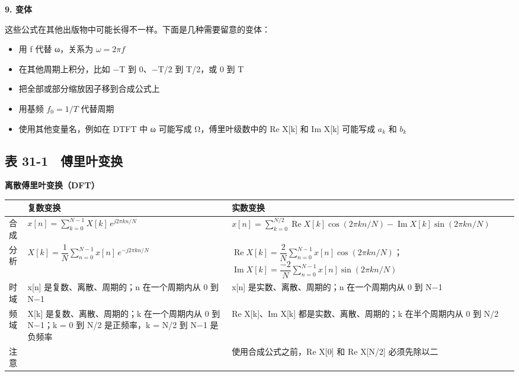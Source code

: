 \textbf{9. 变体}

这些公式在其他出版物中可能长得不一样。下面是几种需要留意的变体：

\begin{itemize}
\tightlist
\item
  用 f 代替 ω，关系为 \(\omega = 2\pi f\)
\item
  在其他周期上积分，比如 −T 到 0、−T/2 到 T/2，或 0 到 T
\item
  把全部或部分缩放因子移到合成公式上
\item
  用基频 \(f_0 = 1/T\) 代替周期
\item
  使用其他变量名，例如在 DTFT 中 ω 可能写成 Ω，傅里叶级数中的 Re
  X{[}k{]} 和 Im X{[}k{]} 可能写成 \(a_k\) 和 \(b_k\)
\end{itemize}

\subsection{表 31-1　傅里叶变换}

\textbf{离散傅里叶变换（DFT）}

{\def\LTcaptype{none} %
\begin{longtable}[]{@{}
  >{\raggedright\arraybackslash}p{}
  >{\raggedright\arraybackslash}p{}
  >{\raggedright\arraybackslash}p{}@{}}
\toprule\noalign{}
\begin{minipage}[b]{\linewidth}\raggedright
\end{minipage} & \begin{minipage}[b]{\linewidth}\raggedright
复数变换
\end{minipage} & \begin{minipage}[b]{\linewidth}\raggedright
实数变换
\end{minipage} \\
\midrule\noalign{}
\endhead
\bottomrule\noalign{}
\endlastfoot
合成 & \(x[n] = \displaystyle\sum_{k=0}^{N-1} X[k]\,e^{j2\pi kn/N}\) &
\(x[n] = \displaystyle\sum_{k=0}^{N/2} \operatorname{Re}X[k]\cos(2\pi kn/N) - \operatorname{Im}X[k]\sin(2\pi kn/N)\) \\
分析 &
\(X[k] = \dfrac{1}{N}\displaystyle\sum_{n=0}^{N-1} x[n]\,e^{-j2\pi kn/N}\)
&
\(\operatorname{Re}X[k] = \dfrac{2}{N}\displaystyle\sum_{n=0}^{N-1} x[n]\cos(2\pi kn/N)\)；\(\operatorname{Im}X[k] = \dfrac{-2}{N}\displaystyle\sum_{n=0}^{N-1} x[n]\sin(2\pi kn/N)\) \\
时域 & x{[}n{]} 是复数、离散、周期的；n 在一个周期内从 0 到 N−1 &
x{[}n{]} 是实数、离散、周期的；n 在一个周期内从 0 到 N−1 \\
频域 & X{[}k{]} 是复数、离散、周期的；k 在一个周期内从 0 到 N−1；k = 0
到 N/2 是正频率，k = N/2 到 N−1 是负频率 & Re X{[}k{]}、Im X{[}k{]}
都是实数、离散、周期的；k 在半个周期内从 0 到 N/2 \\
注意 & & 使用合成公式之前，Re X{[}0{]} 和 Re X{[}N/2{]} 必须先除以二 \\
\end{longtable}
}

